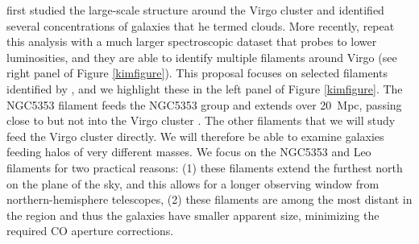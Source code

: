 \documentclass[11pt, preprint]{aastex}
\newcommand{\ha}{H$\alpha$}
\begin{document}
 



\citet{tully82} first studied the large-scale structure around the Virgo
cluster and identified several concentrations of galaxies that he
termed clouds.  More recently, \citet{kim16} repeat this analysis with
a much larger spectroscopic dataset that probes to lower luminosities,
and they are able to identify multiple
filaments around Virgo (see right panel of Figure \ref{kimfigure}).
This proposal focuses on selected filaments identified by
\citet{kim16}, and we highlight these in the left panel of Figure
\ref{kimfigure}.  
The NGC5353 filament feeds the NGC5353 group and extends over 20~Mpc,
passing close to but not into the Virgo cluster \citep{kim16}.  The other filaments
that we will study feed the Virgo cluster directly.   We will therefore be able to examine galaxies feeding halos of very different masses.
We focus on
the NGC5353 and Leo filaments for two practical reasons:  (1) these filaments
extend the furthest north on the plane of the sky, and this allows
for a longer observing window from northern-hemisphere telescopes, (2)
these filaments are among the most distant in the region and
thus the galaxies have smaller apparent size, minimizing the required CO aperture corrections.
\end{document}
